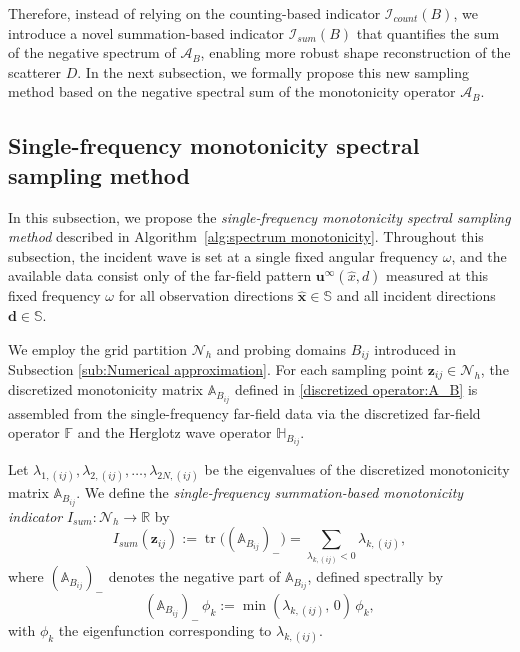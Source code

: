 \documentclass[11pt,reqno,twoside]{amsart}
\theoremstyle{definition}
\theoremstyle{remark}
\numberwithin{equation}{section}
\begin{document}
Therefore, instead of relying on the counting-based indicator $\mathcal I_{count}(B)$, we introduce a novel summation-based indicator $\mathcal I_{sum}(B)$ that quantifies the sum of the negative spectrum of $\mathcal{A}_{B}$, enabling more robust shape reconstruction of the scatterer \(D\). In the next subsection, we formally propose this new sampling method based on the negative spectral sum of the monotonicity operator \(\mathcal{A}_{B}\).


\subsection{Single-frequency monotonicity spectral sampling method}\label{subsec:soft monotonicity indicator}

In this subsection, we propose the \emph{single-frequency monotonicity spectral sampling method} described in Algorithm~\ref{alg:spectrum monotonicity}. Throughout this subsection, the incident wave is set at a single fixed angular frequency $\omega$, and the available data consist only of the far-field pattern $\mathbf{u}^\infty(\hat{x},d)$ measured at this fixed frequency $\omega$ for all observation directions $\hat{\mathbf x}\in\mathbb{S}$ and all incident
directions $\mathbf d\in\mathbb{S}$. 

We employ the grid partition \(\mathcal{N}_h\) and probing domains \(B_{ij}\) introduced in Subsection \ref{sub:Numerical approximation}. For each sampling point $\mathbf{z}_{ij}\in\mathcal{N}_h$, the discretized monotonicity matrix $\mathbb A_{B_{ij}}$ defined in \eqref{discretized operator:A_B} is assembled from the single-frequency far-field data via the discretized far-field operator $\mathbb{F}$ and the Herglotz wave operator $\mathbb{H}_{B_{ij}}$.

Let $\lambda_{1,(ij)}, \lambda_{2,(ij)}, \dots, \lambda_{2N,(ij)}$ be the eigenvalues of the discretized monotonicity matrix $\mathbb A_{B_{ij}}$. We define the \emph{single-frequency summation-based monotonicity indicator} $I_{sum}:\mathcal{N}_h	\to\mathbb{R}$ by
\begin{equation}\label{eq:soft-sec-indicator}
I_{sum}(\mathbf{z}_{ij}):= \operatorname{tr}\bigl((\mathbb A_{B_{ij}})_-\bigr)
=\sum_{\lambda_{k,(ij)} < 0}\lambda_{k,(ij)} ,
\end{equation}
where $(\mathbb A_{B_{ij}})_-$ denotes the negative part of $\mathbb A_{B_{ij}}$, defined spectrally by
$$
(\mathbb A_{B_{ij}})_-\,\phi_k
:=
\min(\lambda_{k,(ij)},\,0)\,\phi_k,
$$
with $\phi_k$ the eigenfunction corresponding to $\lambda_{k,(ij)}$.
\end{document}
